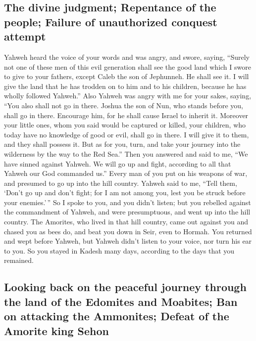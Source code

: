\hypertarget{the-divine-judgment-repentance-of-the-people-failure-of-unauthorized-conquest-attempt}{%
\subsection{The divine judgment; Repentance of the people; Failure of
unauthorized conquest
attempt}\label{the-divine-judgment-repentance-of-the-people-failure-of-unauthorized-conquest-attempt}}

 Yahweh heard the voice of your words and was angry, and
swore, saying,  ``Surely not one of these men of this
evil generation shall see the good land which I swore to give to your
fathers,  except Caleb the son of Jephunneh. He shall see
it. I will give the land that he has trodden on to him and to his
children, because he has wholly followed Yahweh.''  Also
Yahweh was angry with me for your sakes, saying, ``You also shall not go
in there.  Joshua the son of Nun, who stands before you,
shall go in there. Encourage him, for he shall cause Israel to inherit
it.  Moreover your little ones, whom you said would be
captured or killed, your children, who today have no knowledge of good
or evil, shall go in there. I will give it to them, and they shall
possess it.  But as for you, turn, and take your journey
into the wilderness by the way to the Red Sea.''  Then
you answered and said to me, ``We have sinned against Yahweh. We will go
up and fight, according to all that Yahweh our God commanded us.'' Every
man of you put on his weapons of war, and presumed to go up into the
hill country.  Yahweh said to me, ``Tell them, `Don't go
up and don't fight; for I am not among you, lest you be struck before
your enemies.'\,''  So I spoke to you, and you didn't
listen; but you rebelled against the commandment of Yahweh, and were
presumptuous, and went up into the hill country.  The
Amorites, who lived in that hill country, came out against you and
chased you as bees do, and beat you down in Seir, even to Hormah.
 You returned and wept before Yahweh, but Yahweh didn't
listen to your voice, nor turn his ear to you.  So you
stayed in Kadesh many days, according to the days that you remained.

\hypertarget{looking-back-on-the-peaceful-journey-through-the-land-of-the-edomites-and-moabites-ban-on-attacking-the-ammonites-defeat-of-the-amorite-king-sehon}{%
\subsection{Looking back on the peaceful journey through the land of the
Edomites and Moabites; Ban on attacking the Ammonites; Defeat of the
Amorite king
Sehon}\label{looking-back-on-the-peaceful-journey-through-the-land-of-the-edomites-and-moabites-ban-on-attacking-the-ammonites-defeat-of-the-amorite-king-sehon}}

